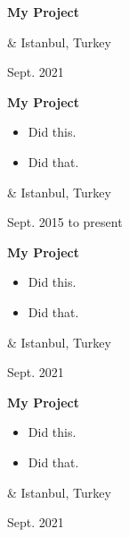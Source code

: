 \documentclass[10pt, letterpaper]{article}
\newenvironment{highlights}{
        \begin{itemize}[
                topsep=0pt,
                parsep=0.10 cm,
                partopsep=0pt,
                itemsep=0pt,
                after=\vspace{-1\baselineskip},
                leftmargin=0.4 cm + 3pt
            ]
    }{
        \end{itemize}
    } %
\let\originalTabularx\tabularx
\let\originalEndTabularx\endtabularx
\renewenvironment{tabularx}{\bgroup\centering\originalTabularx}{\originalEndTabularx\par\egroup}
\begin{document}
        \vspace{0.2 cm}
        \begin{tabularx}{
            \textwidth-0.4 cm-0.13cm
        }{
            K{0.2 cm}
            R{4.1 cm}
        }
            \textbf{My Project}

            \vspace{0.10 cm}

            &
            Istanbul, Turkey

            Sept. 2021
        \end{tabularx}


        \vspace{0.2 cm}
        \begin{tabularx}{
            \textwidth-0.4 cm-0.13cm
        }{
            K{0.2 cm}
            R{4.1 cm}
        }
            \textbf{My Project}

            \vspace{0.10 cm}

            \begin{highlights}
                \item Did this.
                \item Did that.
            \end{highlights}
            &
            Istanbul, Turkey

            Sept. 2015 to present
        \end{tabularx}


        \vspace{0.2 cm}
        \begin{tabularx}{
            \textwidth-0.4 cm-0.13cm
        }{
            K{0.2 cm}
            R{4.1 cm}
        }
            \textbf{My Project}

            \vspace{0.10 cm}

            \begin{highlights}
                \item Did this.
                \item Did that.
            \end{highlights}
            &
            Istanbul, Turkey

            Sept. 2021
        \end{tabularx}


        \vspace{0.2 cm}
        \begin{tabularx}{
            \textwidth-0.4 cm-0.13cm
        }{
            K{0.2 cm}
            R{4.1 cm}
        }
            \textbf{My Project}

            \vspace{0.10 cm}

            \begin{highlights}
                \item Did this.
                \item Did that.
            \end{highlights}
            &
            Istanbul, Turkey

            Sept. 2021
        \end{tabularx}
\end{document}
